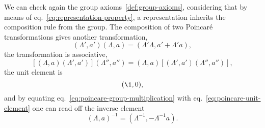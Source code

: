 We can check again the group axioms~\ref{def:group-axioms}, considering that by means of eq.~\eqref{eq:representation-property}, a representation inherits the composition rule from the group. The composition of two Poincaré transformations gives another transformation,
\begin{equation}\label{eq:poincare-group-multiplication}
    (\Lambda', a') (\Lambda, a) = (\Lambda' \Lambda, a' + \Lambda' a),
\end{equation}
the transformation is associative,
\begin{equation}\label{eq:poincare-associative}
    \left[(\Lambda,a)(\Lambda',a')\right] (\Lambda'',a'') = (\Lambda, a) \left[ (\Lambda',a')(\Lambda'',a'') \right],
\end{equation}
the unit element is
\begin{equation}\label{eq:poincare-unit-element}
    (\1,0),
\end{equation}
and by equating eq.~\eqref{eq:poincare-group-multiplication} with eq.~\eqref{eq:poincare-unit-element} one can read off the inverse element
\begin{equation}\label{eq:poincare-inverse-element}
    (\Lambda, a)^{-1} = (\Lambda^{-1}, -\Lambda^{-1}a).
\end{equation}
